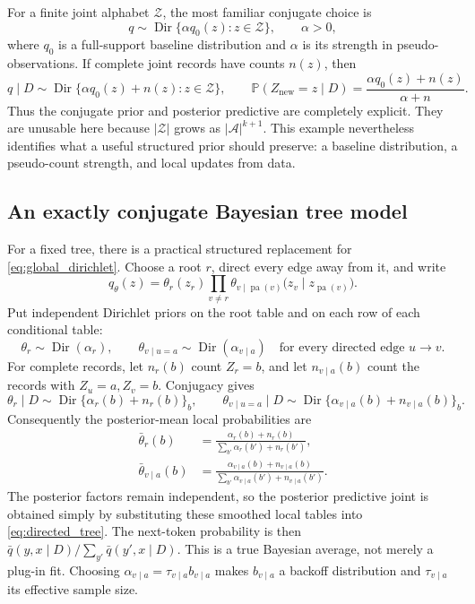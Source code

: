 \documentclass[11pt]{article}
\newcommand{\Pp}{\mathbb P}
\newcommand{\1}{\mathbf 1}
\newcommand{\mcA}{\mathcal A}
\newcommand{\mcZ}{\mathcal Z}
\begin{document}
For a finite joint alphabet \(\mcZ\), the most familiar conjugate choice is
\[
  q\sim\operatorname{Dir}\{\alpha q_0(z):z\in\mcZ\},
  \qquad \alpha>0,
\]
where \(q_0\) is a full-support baseline distribution and \(\alpha\) is its
strength in pseudo-observations.  If complete joint records have counts
\(n(z)\), then
\[
  q\mid D
  \sim
  \operatorname{Dir}\{\alpha q_0(z)+n(z):z\in\mcZ\},
  \qquad
  \Pp(Z_{\mathrm{new}}=z\mid D)
  =
  \frac{\alpha q_0(z)+n(z)}{\alpha+n}.
  \label{eq:global_dirichlet}
\]
Thus the conjugate prior and posterior predictive are completely explicit.
They are unusable here because \(\lvert\mcZ\rvert\) grows as
\(\lvert\mcA\rvert^{k+1}\).  This example nevertheless identifies what a
useful structured prior should preserve: a baseline distribution, a
pseudo-count strength, and local updates from data.

\subsection{An exactly conjugate Bayesian tree model}

For a fixed tree, there is a practical structured replacement for
\eqref{eq:global_dirichlet}.  Choose a root \(r\), direct every edge away from
it, and write
\begin{equation}
  q_\theta(z)
  =
  \theta_r(z_r)
  \prod_{v\ne r}
  \theta_{v\mid \operatorname{pa}(v)}
     \bigl(z_v\mid z_{\operatorname{pa}(v)}\bigr).
  \label{eq:directed_tree}
\end{equation}
Put independent Dirichlet priors on the root table and on each row of each
conditional table:
\[
  \theta_r\sim\operatorname{Dir}(\alpha_r),
  \qquad
  \theta_{v\mid u=a}\sim\operatorname{Dir}(\alpha_{v\mid a})
  \quad\text{for every directed edge }u\to v.
\]
For complete records, let \(n_r(b)\) count \(Z_r=b\), and let
\(n_{v\mid a}(b)\) count the records with \(Z_u=a,Z_v=b\).  Conjugacy gives
\[
  \theta_r\mid D\sim\operatorname{Dir}\{\alpha_r(b)+n_r(b)\}_b,
  \qquad
  \theta_{v\mid u=a}\mid D
  \sim
  \operatorname{Dir}\{\alpha_{v\mid a}(b)+n_{v\mid a}(b)\}_b.
\]
Consequently the posterior-mean local probabilities are
\begin{align}
  \bar\theta_r(b)
  &=
  \frac{\alpha_r(b)+n_r(b)}
       {\sum_{b'}\alpha_r(b')+n_r(b')}, \label{eq:tree_root_predictive}\\
  \bar\theta_{v\mid a}(b)
  &=
  \frac{\alpha_{v\mid a}(b)+n_{v\mid a}(b)}
       {\sum_{b'}\alpha_{v\mid a}(b')+n_{v\mid a}(b')}.
  \label{eq:tree_edge_predictive}
\end{align}
The posterior factors remain independent, so the posterior predictive joint
is obtained simply by substituting these smoothed local tables into
\eqref{eq:directed_tree}.  The next-token probability is then
\(\bar q(y,x\mid D)/\sum_{y'}\bar q(y',x\mid D)\).  This is a true Bayesian
average, not merely a plug-in fit.  Choosing
\(\alpha_{v\mid a}=\tau_{v\mid a}b_{v\mid a}\) makes \(b_{v\mid a}\) a
backoff distribution and \(\tau_{v\mid a}\) its effective sample size.
\end{document}

